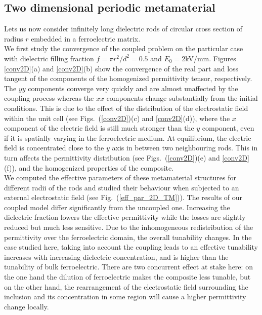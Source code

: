 \documentclass[%
 reprint,
 amsmath,amssymb,
 aps,
]{revtex4-2}
\newcommand{\fig}[1]{Fig.~(\ref{#1})}
\begin{document}
\subsection*{Two dimensional periodic metamaterial}
Lets us now consider infinitely long dielectric rods of circular cross section
of radius $r$ embedded in a ferroelectric matrix.\\
We first study the convergence of the coupled problem on the particular case with dielectric
filling fraction $f=\pi r^2/d^2=0.5$ and $E_0=2$kV/mm. Figures \ref{conv2D}(a) and \ref{conv2D}(b) show the
convergence of the real part and loss tangent of the components of the homogenized
 permittivity tensor, respectively. The $yy$ components converge very quickly
 and are almost unaffected by the coupling process whereas the
 $xx$ components change substantially from the initial conditions.
 This is due to the effect of the distribution
 of the electrostatic field within the unit cell (see Figs.~(\ref{conv2D})(c) and \ref{conv2D}(d)),
 where the $x$ component of the electric field is still much stronger
 than the $y$ component, even if it is spatially varying in the ferroelectric medium.
 At equilibrium, the electric field is concentrated close to the $y$ axis in between two neighbouring
 rods. This in turn affects the permittivity distribution (see Figs.~(\ref{conv2D})(e) and \ref{conv2D}(f)),
 and the homogenized properties of the composite.\\
 We computed the effective parameters of these metamaterial structures for different
 radii of the rods and studied their behaviour when subjected to an external
 electrostatic field (see \fig{eff_par_2D_TM}). The results of our coupled
 model differ significantly from the uncoupled one. Increasing the dielectric fraction
 lowers the effective permittivity while the losses are slightly reduced but much less sensitive.
 Due to the inhomogeneous redistribution of the permittivity over the ferroelectric domain, the
 overall tunability changes. In the case studied here, taking into account the coupling leads to an effective tunability increases with
 increasing dielectric concentration, and is higher than the tunability of bulk ferroelectric.  There are two concurrent effect at stake here: on the one hand
 the dilution of ferroelectric makes the composite less tunable, but on the other hand,
 the rearrangement of the electrostatic field surrounding the inclusion and its
 concentration in some region will cause a higher permittivity change locally.
\end{document}
